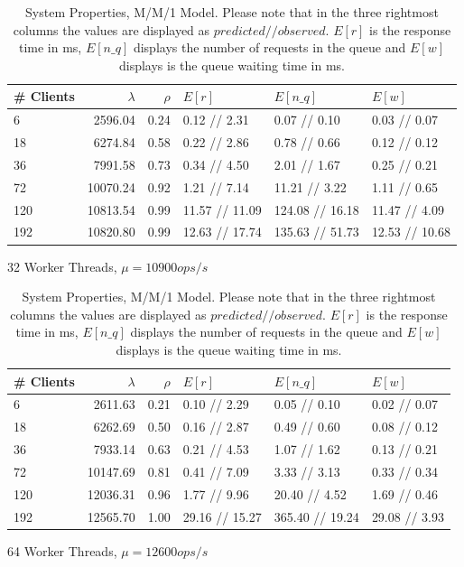 \documentclass[11pt,a4paper]{article}
\begin{document}
\begin{table}
    \begin{subtable}{1.0\linewidth}\centering
        \begin{tabular}{lrrlll}
        \hline
        \# Clients &  $\lambda$&  $\rho$& $E[r]$&        $E[n\_q]$& $E[w]$\\
        \hline
          6 &    2596.04 &    0.24 &    0.12 // 2.31 &     0.07 // 0.10 &    0.03 // 0.07 \\
         18 &    6274.84 &    0.58 &    0.22 // 2.86 &     0.78 // 0.66 &    0.12 // 0.12 \\
         36 &    7991.58 &    0.73 &    0.34 // 4.50  &     2.01 // 1.67 &    0.25 // 0.21 \\
         72 &   10070.24 &    0.92 &    1.21 // 7.14 &    11.21 // 3.22 &    1.11 // 0.65 \\
        120 &   10813.54 &    0.99 &  11.57 // 11.09 &  124.08 // 16.18 &   11.47 // 4.09 \\
        192 &   10820.80 &    0.99 &  12.63 // 17.74 &  135.63 // 51.73 &  12.53 // 10.68 \\
        \hline
        \end{tabular}
        \caption{32 Worker Threads, $\mu = 10900 ops/s$}
    \end{subtable}
    
    \begin{subtable}{1.0\linewidth}\centering
        \begin{tabular}{lrrlll}
        \hline
        \# Clients &  $\lambda$&  $\rho$& $E[r]$&        $E[n\_q]$&        $E[w]$\\
        \hline
          6 &    2611.63 &    0.21 &    0.10 // 2.29 &     0.05 // 0.10 &   0.02 // 0.07 \\
         18 &    6262.69 &    0.50 &    0.16 // 2.87 &     0.49 // 0.60 &   0.08 // 0.12 \\
         36 &    7933.14 &    0.63 &    0.21 // 4.53 &     1.07 // 1.62 &   0.13 // 0.21 \\
         72 &   10147.69 &    0.81 &    0.41 // 7.09 &     3.33 // 3.13 &   0.33 // 0.34 \\
        120 &   12036.31 &    0.96 &    1.77 // 9.96 &    20.40 // 4.52 &   1.69 // 0.46 \\
        192 &   12565.70 &    1.00 &  29.16 // 15.27 &  365.40 // 19.24 &  29.08 // 3.93 \\
        \hline
        \end{tabular}
        \caption{64 Worker Threads, $\mu = 12600 ops/s$}
    \end{subtable}

    \caption{System Properties, M/M/1 Model. Please note that in the three rightmost columns the values are displayed as $predicted  //  observed$. $E[r]$ is the response time in ms,  $E[n\_q]$ displays the number of requests in the queue and $E[w]$ displays is the queue waiting time in ms. }
    \label{mm1}
\end{table}
\end{document}
